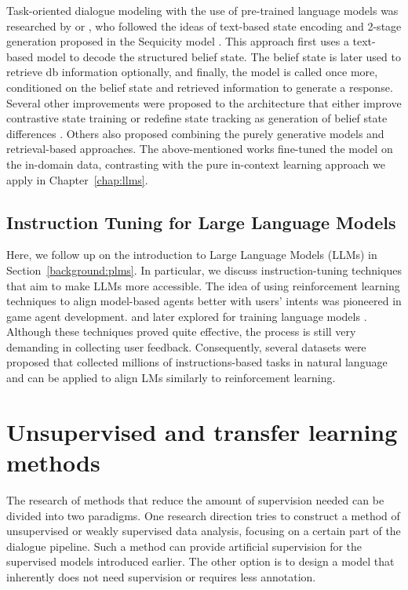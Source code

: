 Task-oriented dialogue modeling with the use of pre-trained language models was researched by \citet{zhang2019dialogpt} or \citet{peng-etal-2021-soloist}, who followed the ideas of text-based state encoding and 2-stage generation proposed in the Sequicity model \cite{lei2018sequicity}.
This approach first uses a text-based model to decode the structured belief state.
The belief state is later used to retrieve db information optionally, and finally, the model is called once more, conditioned on the belief state and retrieved information to generate a response.
Several other improvements were proposed to the architecture that either improve contrastive state training \cite{kulhanek-etal-2021-augpt} or redefine state tracking as generation of belief state differences \cite{lin-etal-2020-mintl}.
Others also proposed combining the purely generative models and retrieval-based approaches\cite{pandey-etal-2018-exemplar,cai-etal-2019-retrieval,nekvinda-dusek-2022-aargh}.
The above-mentioned works fine-tuned the model on the in-domain data, contrasting with the pure in-context learning approach we apply in Chapter~\ref{chap:llms}.

\subsection{Instruction Tuning for Large Language Models}
Here, we follow up on the introduction to Large Language Models (LLMs) in Section~\ref{background:plms}.
In particular, we discuss instruction-tuning techniques that aim to make LLMs more accessible. 
The idea of using reinforcement learning techniques to align model-based agents better with users' intents was pioneered in game agent development. \cite{christiano2017deep} and later explored for training language models \cite{ziegler2019fine,ouyang2022training}.
Although these techniques proved quite effective, the process is still very demanding in collecting user feedback.
Consequently, several datasets were proposed \cite{supernaturalinstructions,iyer2022opt,black2022gpt} that collected millions of instructions-based tasks in natural language and can be applied to align LMs similarly to reinforcement learning.

\section{Unsupervised and transfer learning methods}
\label{sec:relwork-unsup}
The research of methods that reduce the amount of supervision needed can be divided into two paradigms.
One research direction tries to construct a method of unsupervised or weakly supervised data analysis, focusing on a certain part of the dialogue pipeline.
Such a method can provide artificial supervision for the supervised models introduced earlier.
The other option is to design a model that inherently does not need supervision or requires less annotation.

